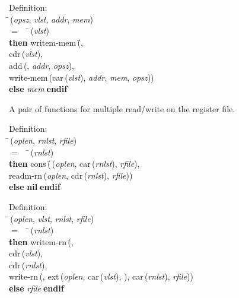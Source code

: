 \begin{tabbing}{\sc Definition}: \\  
\=\,({\it{opsz\/}}, {\it{vlst\/}}, {\it{addr\/}}, {\it{mem\/}}) \\ 
$=$$\;\;\;\;$\=\,({\it{vlst\/}}) \\ 
{\bf then }{\rm{writem-mem}}\,(\=, \\ 
{\rm{cdr}}\,({\it{vlst\/}}), \\ 
{\rm{add}}\,({}, {\it{addr\/}}, {\it{opsz\/}}), \\ 
{\rm{write-mem}}\,({\rm{car}}\,({\it{vlst\/}}), {\it{addr\/}}, {\it{mem\/}}, {\it{opsz\/}}))\- \\ 
{\bf else }{\it{mem\/}}$\;${\bf  endif}\-\-
\end{tabbing}

 A pair of functions for multiple read/write on the register file.
\begin{tabbing}{\sc Definition}: \\  
\=\,({\it{oplen\/}}, {\it{rnlst\/}}, {\it{rfile\/}}) \\ 
$=$$\;\;\;\;$\=\,({\it{rnlst\/}}) \\ 
{\bf then }{\rm{cons}}\,(\=\,({\it{oplen\/}}, {\rm{car}}\,({\it{rnlst\/}}), {\it{rfile\/}}), \\ 
{\rm{readm-rn}}\,({\it{oplen\/}}, {\rm{cdr}}\,({\it{rnlst\/}}), {\it{rfile\/}}))\- \\ 
{\bf else }{\bf{nil}}$\;${\bf  endif}\-\-
\end{tabbing}

\begin{tabbing}{\sc Definition}: \\  
\=\,({\it{oplen\/}}, {\it{vlst\/}}, {\it{rnlst\/}}, {\it{rfile\/}}) \\ 
$=$$\;\;\;\;$\=\,({\it{rnlst\/}}) \\ 
{\bf then }{\rm{writem-rn}}\,(\=, \\ 
{\rm{cdr}}\,({\it{vlst\/}}), \\ 
{\rm{cdr}}\,({\it{rnlst\/}}), \\ 
{\rm{write-rn}}\,({}, {\rm{ext}}\,({\it{oplen\/}}, {\rm{car}}\,({\it{vlst\/}}), {}), {\rm{car}}\,({\it{rnlst\/}}), {\it{rfile\/}}))\- \\ 
{\bf else }{\it{rfile\/}}$\;${\bf  endif}\-\-
\end{tabbing}

